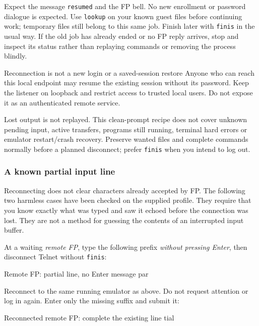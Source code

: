 Expect the message \texttt{resumed} and the FP bell. No new enrollment or
password dialogue is expected. Use \texttt{lookup} on your known guest files
before continuing work; temporary files still belong to this same job.
Finish later with \texttt{finis} in the usual way. If the old job has already
ended or no FP reply arrives, stop and inspect its status rather than
replaying commands or removing the process blindly.

\begin{operationnote}{Reconnection is not a new login or a saved-session restore}
Anyone who can reach this local endpoint may resume the existing session
without its password. Keep the listener on loopback and restrict access to
trusted local users. Do not expose it as an authenticated remote service.

Lost output is not replayed. This clean-prompt recipe does not cover unknown
pending input, active transfers, programs still running, terminal hard errors or emulator
restart/crash recovery. Preserve wanted files and complete commands normally
before a planned disconnect; prefer \texttt{finis} when you intend to log out.
\end{operationnote}

\subsubsection{A known partial input line}\label{mips-ts-partial-input}

Reconnecting does not clear characters already accepted by FP. The following
two harmless cases have been checked on the supplied profile. They require
that you know exactly what was typed and saw it echoed before the connection
was lost. They are not a method for guessing the contents of an interrupted
input buffer.

At a waiting \emph{remote FP}, type the following prefix \emph{without
pressing Enter}, then disconnect Telnet without \texttt{finis}:

\begin{commandexample}{Remote FP: partial line, no Enter}
message par
\end{commandexample}

Reconnect to the same running emulator as above. Do not request attention or
log in again. Enter only the missing suffix and submit it:

\begin{commandexample}{Reconnected remote FP: complete the existing line}
tial
\end{commandexample}


